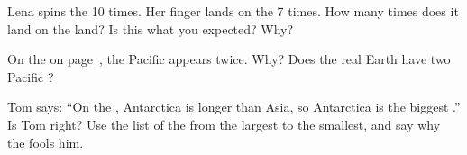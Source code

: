 \begin{exercise}[$\star\star$]\label{exo:g3:continents-and-oceans:8}
Lena spins the  10 times. Her finger lands on the  7 times. How
many times does it land on the land? Is this what you expected? Why?
\end{exercise}

\begin{exercise}[$\star\star$]\label{exo:g3:continents-and-oceans:9}
On the  on page~\pageref{fig:g3:continents-and-oceans:world-map}, the
Pacific  appears twice. Why? Does the real Earth have two Pacific
?
\end{exercise}

\begin{exercise}[$\star\star\star$]\label{exo:g3:continents-and-oceans:10}
Tom says: ``On the , Antarctica is longer than Asia, so Antarctica
is the biggest .'' Is Tom right? Use the list of the 
from the largest to the smallest, and say why the  fools him.
\end{exercise}
